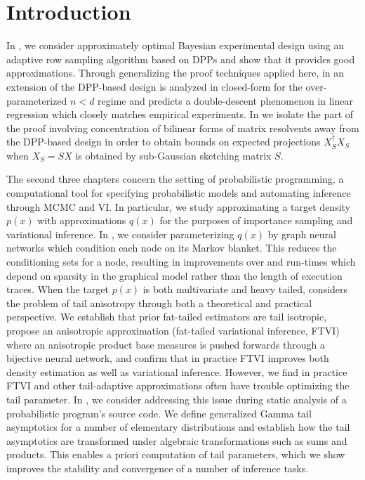 \chapter{Introduction}

In , we consider approximately optimal Bayesian experimental design
using an adaptive row sampling algorithm based on DPPs and show that it provides
good approximations. Through generalizing the proof techniques 
applied here, in  an extension of the DPP-based design is analyzed in
closed-form for the over-parameterized $n < d$ regime and predicts a double-descent phenomenon in
linear regression which closely matches empirical experiments.
In  we isolate the part of the proof involving concentration
of bilinear forms of matrix resolvents away from the DPP-based design in order to obtain bounds on
expected projections $X_S^\dag X_S$ when $X_S = S X$ is obtained by sub-Gaussian sketching matrix $S$.

The second three chapters concern the setting of probabilistic programming, a computational tool
for specifying probabilistic models and automating inference through MCMC and VI. In particular, we  
study approximating a target density $p(x)$ with approximations $q(x)$ for the purposes of
importance sampling and variational inference.
In , we consider parameterizing $q(x)$ by graph neural networks which condition each
node on its Markov blanket. This reduces the conditioning sets for a node, resulting in improvements over
\cite{le2017inference} and run-times which depend on sparsity in the graphical model rather than
the length of execution traces.
When the target $p(x)$ is both multivariate and heavy tailed, 
considers the problem of tail anisotropy through both a theoretical and practical perspective.
We establish that prior fat-tailed estimators \citep{jaini2020tails} are tail isotropic, propose
an anisotropic approximation (fat-tailed variational inference, FTVI) where
an anisotropic product base measures is pushed forwards through a bijective neural network,
and confirm that in practice FTVI improves both density estimation as well as variational inference.
However, we find in practice FTVI and other tail-adaptive approximations often have trouble optimizing
the tail parameter. In , we consider addressing this issue during static analysis of a
probabilistic program's source code. We define generalized Gamma tail asymptotics for a number of
elementary distributions and establish how the tail asymptotics are transformed under algebraic transformations
such as sums and products. This enables a priori computation of tail parameters, which we show
improves the stability and convergence of a number of inference tasks.